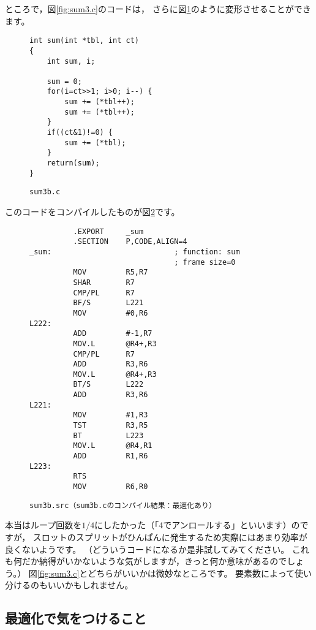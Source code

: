 \documentclass[a4j,10pt,fleqn]{jsarticle}
\begin{document}
ところで，図\ref{fig:sum3.c}のコードは，
さらに図\ref{fig:sum3b.c}のように変形させることができます。
\begin{figure}[tpb]
\begin{boxnote}
{\small\begin{verbatim}
int sum(int *tbl, int ct)
{
    int sum, i;

    sum = 0;
    for(i=ct>>1; i>0; i--) {
        sum += (*tbl++);
        sum += (*tbl++);
    }
    if((ct&1)!=0) {
        sum += (*tbl);
    }
    return(sum);
}
\end{verbatim}}
\end{boxnote}
\caption{\texttt{sum3b.c}} \label{fig:sum3b.c}
\end{figure}
このコードをコンパイルしたものが図\ref{fig:sum3b_op.src}です。
\begin{figure}[tpb]
\begin{boxnote}
{\small\begin{verbatim}
          .EXPORT     _sum
          .SECTION    P,CODE,ALIGN=4
_sum:                            ; function: sum
                                 ; frame size=0
          MOV         R5,R7
          SHAR        R7
          CMP/PL      R7
          BF/S        L221
          MOV         #0,R6
L222:
          ADD         #-1,R7
          MOV.L       @R4+,R3
          CMP/PL      R7
          ADD         R3,R6
          MOV.L       @R4+,R3
          BT/S        L222
          ADD         R3,R6
L221:
          MOV         #1,R3
          TST         R3,R5
          BT          L223
          MOV.L       @R4,R1
          ADD         R1,R6
L223:
          RTS
          MOV         R6,R0
\end{verbatim}}
\end{boxnote}
\caption{\texttt{sum3b.src（sum3b.cのコンパイル結果：最適化あり）}} \label{fig:sum3b_op.src}
\end{figure}
本当はループ回数を$1/4$にしたかった（「4でアンロールする」といいます）のですが，
スロットのスプリットがひんぱんに発生するため実際にはあまり効率が良くないようです。
（どういうコードになるか是非試してみてください。
これも何だか納得がいかないような気がしますが，きっと何か意味があるのでしょう。）
図\ref{fig:sum3.c}とどちらがいいかは微妙なところです。
要素数によって使い分けるのもいいかもしれません。


\clearpage
\subsection{最適化で気をつけること}
\end{document}
